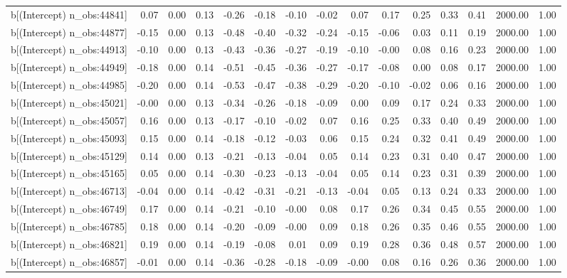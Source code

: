 \begin{table}[ht]
\begin{tabular}{rrrrrrrrrrrrrrr}
  b[(Intercept) n\_obs:44841] & 0.07 & 0.00 & 0.13 & -0.26 & -0.18 & -0.10 & -0.02 & 0.07 & 0.17 & 0.25 & 0.33 & 0.41 & 2000.00 & 1.00 \\ 
  b[(Intercept) n\_obs:44877] & -0.15 & 0.00 & 0.13 & -0.48 & -0.40 & -0.32 & -0.24 & -0.15 & -0.06 & 0.03 & 0.11 & 0.19 & 2000.00 & 1.00 \\ 
  b[(Intercept) n\_obs:44913] & -0.10 & 0.00 & 0.13 & -0.43 & -0.36 & -0.27 & -0.19 & -0.10 & -0.00 & 0.08 & 0.16 & 0.23 & 2000.00 & 1.00 \\ 
  b[(Intercept) n\_obs:44949] & -0.18 & 0.00 & 0.14 & -0.51 & -0.45 & -0.36 & -0.27 & -0.17 & -0.08 & 0.00 & 0.08 & 0.17 & 2000.00 & 1.00 \\ 
  b[(Intercept) n\_obs:44985] & -0.20 & 0.00 & 0.14 & -0.53 & -0.47 & -0.38 & -0.29 & -0.20 & -0.10 & -0.02 & 0.06 & 0.16 & 2000.00 & 1.00 \\ 
  b[(Intercept) n\_obs:45021] & -0.00 & 0.00 & 0.13 & -0.34 & -0.26 & -0.18 & -0.09 & 0.00 & 0.09 & 0.17 & 0.24 & 0.33 & 2000.00 & 1.00 \\ 
  b[(Intercept) n\_obs:45057] & 0.16 & 0.00 & 0.13 & -0.17 & -0.10 & -0.02 & 0.07 & 0.16 & 0.25 & 0.33 & 0.40 & 0.49 & 2000.00 & 1.00 \\ 
  b[(Intercept) n\_obs:45093] & 0.15 & 0.00 & 0.14 & -0.18 & -0.12 & -0.03 & 0.06 & 0.15 & 0.24 & 0.32 & 0.41 & 0.49 & 2000.00 & 1.00 \\ 
  b[(Intercept) n\_obs:45129] & 0.14 & 0.00 & 0.13 & -0.21 & -0.13 & -0.04 & 0.05 & 0.14 & 0.23 & 0.31 & 0.40 & 0.47 & 2000.00 & 1.00 \\ 
  b[(Intercept) n\_obs:45165] & 0.05 & 0.00 & 0.14 & -0.30 & -0.23 & -0.13 & -0.04 & 0.05 & 0.14 & 0.23 & 0.31 & 0.39 & 2000.00 & 1.00 \\ 
  b[(Intercept) n\_obs:46713] & -0.04 & 0.00 & 0.14 & -0.42 & -0.31 & -0.21 & -0.13 & -0.04 & 0.05 & 0.13 & 0.24 & 0.33 & 2000.00 & 1.00 \\ 
  b[(Intercept) n\_obs:46749] & 0.17 & 0.00 & 0.14 & -0.21 & -0.10 & -0.00 & 0.08 & 0.17 & 0.26 & 0.34 & 0.45 & 0.55 & 2000.00 & 1.00 \\ 
  b[(Intercept) n\_obs:46785] & 0.18 & 0.00 & 0.14 & -0.20 & -0.09 & -0.00 & 0.09 & 0.18 & 0.26 & 0.35 & 0.46 & 0.55 & 2000.00 & 1.00 \\ 
  b[(Intercept) n\_obs:46821] & 0.19 & 0.00 & 0.14 & -0.19 & -0.08 & 0.01 & 0.09 & 0.19 & 0.28 & 0.36 & 0.48 & 0.57 & 2000.00 & 1.00 \\ 
  b[(Intercept) n\_obs:46857] & -0.01 & 0.00 & 0.14 & -0.36 & -0.28 & -0.18 & -0.09 & -0.00 & 0.08 & 0.16 & 0.26 & 0.36 & 2000.00 & 1.00 \\ 

\end{tabular}
\end{table}

